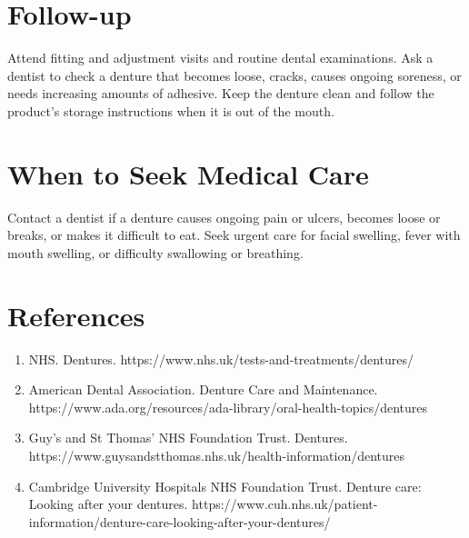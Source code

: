 \section*{Follow-up}
Attend fitting and adjustment visits and routine dental examinations. Ask a dentist to check a denture that becomes loose, cracks, causes ongoing soreness, or needs increasing amounts of adhesive. Keep the denture clean and follow the product's storage instructions when it is out of the mouth.

\section*{When to Seek Medical Care}
Contact a dentist if a denture causes ongoing pain or ulcers, becomes loose or breaks, or makes it difficult to eat. Seek urgent care for facial swelling, fever with mouth swelling, or difficulty swallowing or breathing.

\section*{References}
\begin{enumerate}
  \item NHS. Dentures. https://www.nhs.uk/tests-and-treatments/dentures/
  \item American Dental Association. Denture Care and Maintenance. https://www.ada.org/resources/ada-library/oral-health-topics/dentures
  \item Guy's and St Thomas' NHS Foundation Trust. Dentures. https://www.guysandstthomas.nhs.uk/health-information/dentures
  \item Cambridge University Hospitals NHS Foundation Trust. Denture care: Looking after your dentures. https://www.cuh.nhs.uk/patient-information/denture-care-looking-after-your-dentures/
\end{enumerate}

\clearpage

